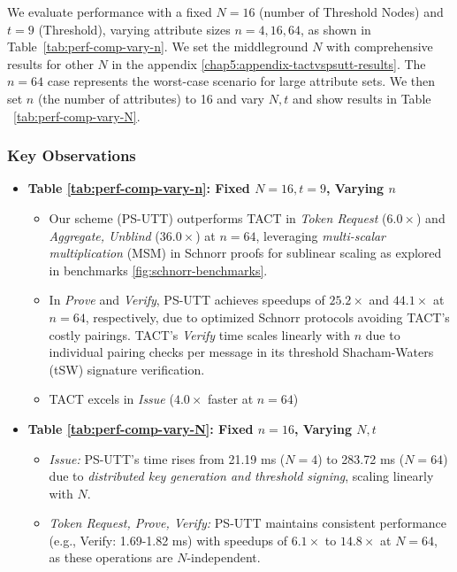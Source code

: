 We evaluate performance with a fixed $N = 16$ (number of Threshold Nodes) and $t = 9$ (Threshold), varying attribute sizes $n = 4, 16, 64$, as shown in Table~\ref{tab:perf-comp-vary-n}. We set the middleground $N$ with comprehensive results for other $N$ in the appendix \ref{chap5:appendix-tactvspsutt-results}. The $n = 64$ case represents the worst-case scenario for large attribute sets. We then set $n$ (the number of attributes) to 16 and vary $N, t$ and show results in Table ~\ref{tab:perf-comp-vary-N}.

\subsubsection{Key Observations}

\begin{itemize}
    \item \textbf{Table \ref{tab:perf-comp-vary-n}: Fixed $N = 16, t = 9$, Varying $n$}
        \begin{itemize}
        \item Our scheme (PS-UTT) outperforms TACT in \textit{Token Request} ($6.0\times$) and \textit{Aggregate, Unblind} ($36.0\times$) at $n = 64$, leveraging \textit{multi-scalar multiplication} (MSM) in Schnorr proofs for sublinear scaling as explored in benchmarks \ref{fig:schnorr-benchmarks}. 
        
        \item In \textit{Prove} and \textit{Verify}, PS-UTT achieves speedups of $25.2\times$ and $44.1\times$ at $n = 64$, respectively, due to optimized Schnorr protocols avoiding TACT's costly pairings. TACT's \textit{Verify} time scales linearly with $n$ due to individual pairing checks per message in its threshold Shacham-Waters (tSW) signature verification.
        
        \item TACT excels in \textit{Issue} ($4.0\times$ faster at $n = 64$)
    \end{itemize}

    \item  \textbf{Table \ref{tab:perf-comp-vary-N}: Fixed $n = 16$, Varying $N,t$}
        \begin{itemize}
            \item \textit{Issue:} PS-UTT's time rises from 21.19 ms ($N = 4$) to 283.72 ms ($N = 64$) due to \textit{distributed key generation and threshold signing}, scaling linearly with $N$. 
            \item \textit{Token Request, Prove, Verify:} PS-UTT maintains consistent performance (e.g., Verify: 1.69-1.82 ms) with speedups of $6.1\times$ to $14.8\times$ at $N = 64$, as these operations are $N$-independent.
        \end{itemize}


\end{itemize}
